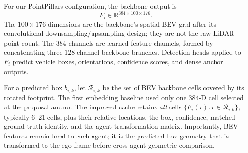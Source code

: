 \documentclass[11pt]{article}
\begin{document}
For our PointPillars configuration, the backbone output is
\begin{equation}
  F_i \in \mathbb{R}^{384\times100\times176}.
\end{equation}
The $100\times176$ dimensions are the backbone's spatial BEV grid after its
convolutional downsampling/upsampling design; they are not the raw LiDAR
point count. The $384$ channels are learned feature channels, formed by
concatenating three $128$-channel backbone branches. Detection heads applied
to $F_i$ predict vehicle boxes, orientations, confidence scores, and dense
anchor outputs.

For a predicted box $b_{i,k}$, let $\mathcal{R}_{i,k}$ be the set of BEV
backbone cells covered by its rotated footprint. The first embedding baseline
used only one $384$-D cell selected at the proposal anchor. The improved cache
retains \emph{all} cells $\{F_i(r):r\in\mathcal{R}_{i,k}\}$, typically
6--21 cells, plus their relative locations, the box, confidence, matched
ground-truth identity, and the agent transformation matrix. Importantly, BEV
features remain local to each agent; it is the predicted box geometry that is
transformed to the ego frame before cross-agent geometric comparison.
\end{document}
